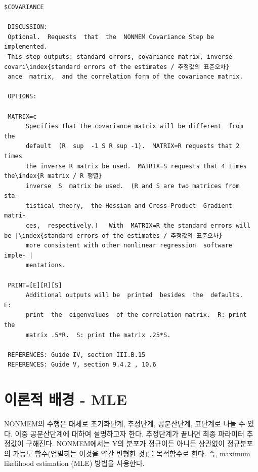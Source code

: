 \documentclass[
  10pt,
  krantz2,
  a4paper]{krantz}
\theoremstyle{definition}
\theoremstyle{definition}
\theoremstyle{definition}
\theoremstyle{remark}
\begin{document}
\begin{verbatim}
$COVARIANCE

 DISCUSSION:
 Optional.  Requests  that  the  NONMEM Covariance Step be implemented.
 This step outputs: standard errors, covariance matrix, inverse covari\index{standard errors of the estimates / 추정값의 표준오차}
 ance  matrix,  and the correlation form of the covariance matrix.

 OPTIONS:

 MATRIX=c
      Specifies that the covariance matrix will be different  from  the
      default  (R  sup  -1 S R sup -1).  MATRIX=R requests that 2 times
      the inverse R matrix be used.  MATRIX=S requests that 4 times the\index{R matrix / R 행렬}
      inverse  S  matrix be used.  (R and S are two matrices from  sta-
      tistical theory,  the Hessian and Cross-Product  Gradient  matri-
      ces,  respectively.)   With  MATRIX=R the standard errors will be |\index{standard errors of the estimates / 추정값의 표준오차}
      more consistent with other nonlinear regression  software  imple- |
      mentations.

 PRINT=[E][R][S]
      Additional outputs will be  printed  besides  the  defaults.   E:
      print  the  eigenvalues  of the correlation matrix.  R: print the
      matrix .5*R.  S: print the matrix .25*S.

 REFERENCES: Guide IV, section III.B.15
 REFERENCES: Guide V, section 9.4.2 , 10.6
\end{verbatim}


\hypertarget{uxc774uxb860uxc801-uxbc30uxacbd---mle}{%
\section{이론적 배경 - MLE}\label{uxc774uxb860uxc801-uxbc30uxacbd---mle}}


NONMEM의 수행은 대체로 초기화단계, 추정단계, 공분산단계, 표단계로 나눌 수 있다. 이중 공분산단계에 대하여 설명하고자 한다. 추정단계가 끝나면 최종 파라미터 추정값이 구해진다. NONMEM에서는 Y의 분포가 정규이든 아니든 상관없이 정규분포의 가능도 함수(엄밀히는 이것을 약간 변형한 것)를 목적함수로 한다. 즉, maximum likelihood estimation (MLE) 방법을 사용한다.
\end{document}
